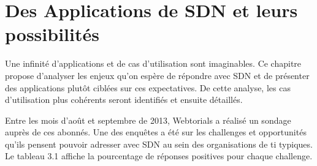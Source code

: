 
\chapter{Des Applications de SDN et leurs possibilités}


Une infinité d'applications et de cas d'utilisation sont imaginables. Ce chapitre propose d'analyser les enjeux qu'on espère de répondre avec SDN et de présenter des applications plutôt ciblées sur ces expectatives. De cette analyse, les cas d'utilisation plus cohérents seront identifiés et ensuite détaillés.

 

Entre les mois d'août et septembre de 2013, Webtorials a réalisé un sondage auprès de ces abonnés. Une des enquêtes a été sur les challenges et opportunités qu'ils pensent pouvoir adresser avec SDN au sein des organisations de \gls{ti} typiques. Le tableau 3.1 affiche la pourcentage de réponses positives pour chaque challenge. \cite{2013GuideSDNNVUseCases}

